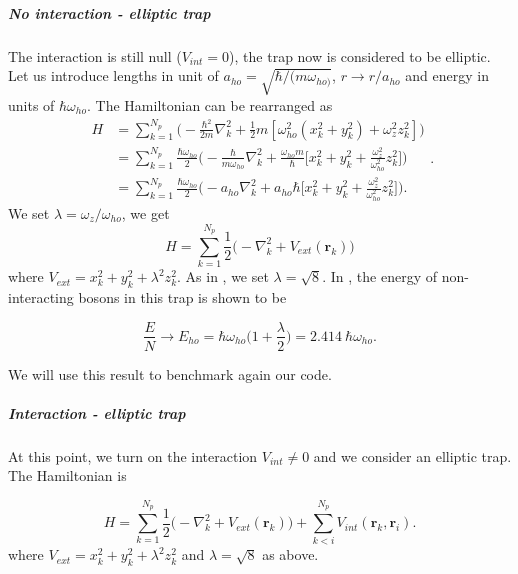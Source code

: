 \subparagraph{No interaction - elliptic trap}
The interaction is still null ($V_{int}=0$), the trap now is considered to be elliptic.\\
Let us introduce lengths in unit of $a_{ho}=\sqrt{\hbar/(m\omega_{ho)}}$, $r\rightarrow r/a_{ho}$ and energy in units of $\hbar\omega_{ho}$. The Hamiltonian can be rearranged as 
\begin{equation*}
\begin{split}
H&=\sum_{k=1}^{N_p}\bigg(-\frac{\hbar^2}{2m}\nabla^2_{k}+\frac{1}{2}m[\omega^{2}_{ho}(x^2_k+y^2_k)+\omega^{2}_{z}z_k^2]\bigg)\\
&=\sum_{k=1}^{N_p}\frac{\hbar \omega_{ho}}{2}\bigg(-\frac{\hbar}{m\omega_{ho}}\nabla^2_{k}+\frac{\omega_{ho}m}{\hbar}\bigg[x^2_k+y^2_k+\frac{\omega^{2}_{z}}{\omega^{2}_{ho}}z^2_k\bigg]\bigg)\\
&=\sum_{k=1}^{N_p}\frac{\hbar \omega_{ho}}{2}\bigg(-a_{ho}\nabla^2_{k}+a_{ho}{\hbar}\bigg[x^2_k+y^2_k+\frac{\omega^{2}_{z}}{\omega^{2}_{ho}}z^2_k\bigg]\bigg).
\end{split}.
\end{equation*}
We set $\lambda=\omega_z/\omega_{ho}$, we get
\begin{equation}
\label{ham}
H=\sum_{k=1}^{N_p}\frac{1}{2}\bigg(-\nabla^2_{k}+V_{ext}(\mathbf{r}_k)\bigg)
\end{equation}
where $V_{ext}=x^2_k+y^2_k+\lambda^2 z^2_k$. As in \cite{DalfString}, we set $\lambda=\sqrt{8}$. In \cite{vmcarticle}, the energy of non-interacting bosons in this trap is shown to be

\begin{equation*}
	\frac{E}{N}\rightarrow E_{ho}=\hbar\omega_{ho}\bigg(1+\frac{\lambda}{2}\bigg)=2.414\ \hbar\omega_{ho}.
\end{equation*}

We will use this result to benchmark again our code.

\subparagraph{Interaction - elliptic trap}
At this point, we turn on the interaction $V_{int}\neq 0$ and we consider an elliptic trap. The Hamiltonian is

\begin{equation}
\label{ham2}
H=\sum_{k=1}^{N_p}\frac{1}{2}\bigg(-\nabla^2_{k}+V_{ext}(\mathbf{r}_k)\bigg)+\sum_{k<i}^{N_p} V_{int}(\mathbf{r}_k,\mathbf{r}_i).
\end{equation}
where $V_{ext}=x^2_k+y^2_k+\lambda^2 z^2_k$ and $\lambda=\sqrt{8}$ as above.

